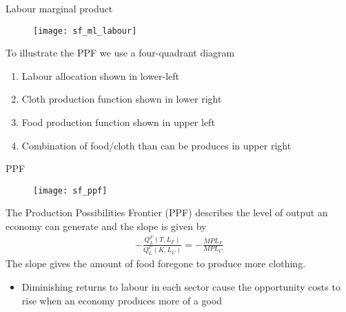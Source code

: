 \documentclass{beamer}
\begin{document}
\begin{frame}{Labour marginal product}
  \begin{figure}
    \texttt{[image: sf\_ml\_labour]}
  \end{figure}
\end{frame}

\begin{frame}
  To illustrate the PPF we use a four-quadrant diagram
  \begin{enumerate}
    \item Labour allocation shown in lower-left
    \item Cloth production function shown in lower right
    \item Food production function shown in upper left
    \item Combination of food/cloth than can be produces in upper right
  \end{enumerate}
\end{frame}

\begin{frame}{PPF}
  \begin{figure}
    \texttt{[image: sf\_ppf]}
  \end{figure}
\end{frame}

\begin{frame}
  The Production Possibilities Frontier (PPF) describes the level of output an economy can generate and the slope is given by
  \begin{align*}
    - \frac{Q_L^F(T,L_F)}{Q_L^C(K,L_C)}=-\frac{MPL_F}{MPL_C}
  \end{align*}
  \medskip
  The slope gives the amount of food foregone to produce more clothing.
    \begin{itemize}
      \item Diminishing returns to labour in each sector cause the opportunity costs to rise when an economy produces more of a good
    \end{itemize}
\end{frame}
\end{document}
